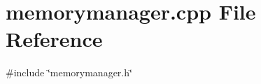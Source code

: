 \section{memorymanager.\+cpp File Reference}
\label{memorymanager_8cpp}
{\ttfamily \#include \char`\"{}memorymanager.\+h\char`\"{}}\newline
